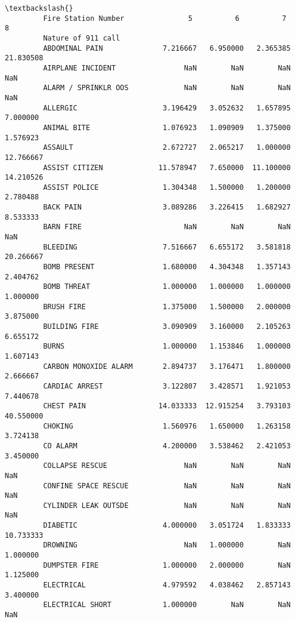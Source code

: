 \documentclass[11pt]{article}
\begin{document}
\begin{Verbatim}[commandchars=\\\{\}]
                                                                                 \textbackslash{}
         Fire Station Number               5          6          7           8    
         Nature of 911 call                                                       
         ABDOMINAL PAIN              7.216667   6.950000   2.365385   21.830508   
         AIRPLANE INCIDENT                NaN        NaN        NaN         NaN   
         ALARM / SPRINKLR OOS             NaN        NaN        NaN         NaN   
         ALLERGIC                    3.196429   3.052632   1.657895    7.000000   
         ANIMAL BITE                 1.076923   1.090909   1.375000    1.576923   
         ASSAULT                     2.672727   2.065217   1.000000   12.766667   
         ASSIST CITIZEN             11.578947   7.650000  11.100000   14.210526   
         ASSIST POLICE               1.304348   1.500000   1.200000    2.780488   
         BACK PAIN                   3.089286   3.226415   1.682927    8.533333   
         BARN FIRE                        NaN        NaN        NaN         NaN   
         BLEEDING                    7.516667   6.655172   3.581818   20.266667   
         BOMB PRESENT                1.680000   4.304348   1.357143    2.404762   
         BOMB THREAT                 1.000000   1.000000   1.000000    1.000000   
         BRUSH FIRE                  1.375000   1.500000   2.000000    3.875000   
         BUILDING FIRE               3.090909   3.160000   2.105263    6.655172   
         BURNS                       1.000000   1.153846   1.000000    1.607143   
         CARBON MONOXIDE ALARM       2.894737   3.176471   1.800000    2.666667   
         CARDIAC ARREST              3.122807   3.428571   1.921053    7.440678   
         CHEST PAIN                 14.033333  12.915254   3.793103   40.550000   
         CHOKING                     1.560976   1.650000   1.263158    3.724138   
         CO ALARM                    4.200000   3.538462   2.421053    3.450000   
         COLLAPSE RESCUE                  NaN        NaN        NaN         NaN   
         CONFINE SPACE RESCUE             NaN        NaN        NaN         NaN   
         CYLINDER LEAK OUTSDE             NaN        NaN        NaN         NaN   
         DIABETIC                    4.000000   3.051724   1.833333   10.733333   
         DROWNING                         NaN   1.000000        NaN    1.000000   
         DUMPSTER FIRE               1.000000   2.000000        NaN    1.125000   
         ELECTRICAL                  4.979592   4.038462   2.857143    3.400000   
         ELECTRICAL SHORT            1.000000        NaN        NaN         NaN   

\end{Verbatim}
\end{document}
